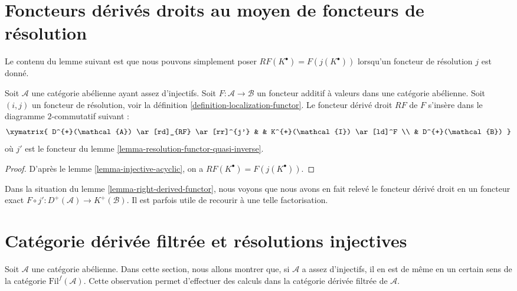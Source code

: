 \section{Foncteurs dérivés droits au moyen de foncteurs de résolution}
\label{section-right-derived-functor-via-resolutions}

\noindent
Le contenu du lemme suivant est que nous pouvons simplement poser
$RF(K^\bullet) = F(j(K^\bullet))$ lorsqu'un foncteur de résolution $j$ est
donné.

\begin{lemma}
\label{lemma-right-derived-functor}
Soit $\mathcal{A}$ une catégorie abélienne ayant assez d'injectifs.
Soit $F : \mathcal{A} \to \mathcal{B}$ un foncteur additif à valeurs dans une
catégorie abélienne. Soit $(i, j)$ un foncteur de résolution, voir la
définition \ref{definition-localization-functor}.
Le foncteur dérivé droit $RF$ de $F$ s'insère dans le diagramme
$2$-commutatif suivant :
$$
\xymatrix{
D^{+}(\mathcal{A}) \ar[rd]_{RF} \ar[rr]^{j'} & &
K^{+}(\mathcal{I}) \ar[ld]^F \\
& D^{+}(\mathcal{B})
}
$$
où $j'$ est le foncteur du
lemme \ref{lemma-resolution-functor-quasi-inverse}.
\end{lemma}

\begin{proof}
D'après le lemme \ref{lemma-injective-acyclic}, on a
$RF(K^\bullet) = F(j(K^\bullet))$.
\end{proof}

\begin{remark}
\label{remark-right-derived-functor}
Dans la situation du lemme \ref{lemma-right-derived-functor}, nous voyons que
nous avons en fait relevé le foncteur dérivé droit en un foncteur exact
$F \circ j' : D^{+}(\mathcal{A}) \to K^{+}(\mathcal{B})$.
Il est parfois utile de recourir à une telle factorisation.
\end{remark}


\section{Catégorie dérivée filtrée et résolutions injectives}
\label{section-filtered-derived}

\noindent
Soit $\mathcal{A}$ une catégorie abélienne. Dans cette section, nous allons
montrer que, si $\mathcal{A}$ a assez d'injectifs, il en est de même en un
certain sens de la catégorie $\text{Fil}^f(\mathcal{A})$. Cette observation
permet d'effectuer des calculs dans la catégorie dérivée filtrée de
$\mathcal{A}$.

